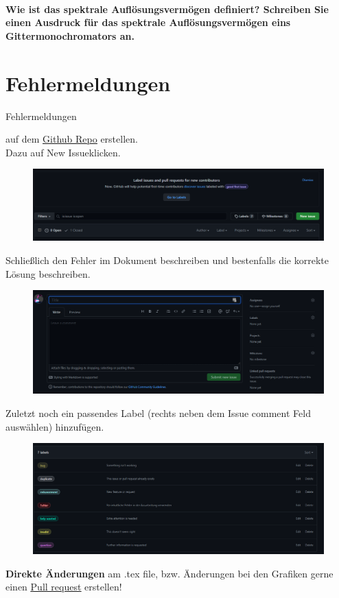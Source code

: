 \documentclass[a4paper, 11pt, parskip=half]{scrartcl}
\begin{document}
\paragraph{Wie ist das spektrale Auflösungsvermögen definiert? Schreiben Sie einen Ausdruck für das
spektrale Auflösungsvermögen eins Gittermonochromators an.}
\newpage
\section{Fehlermeldungen}
\label{sec:Fehler}
\hypertarget{Fehler}{Fehlermeldungen} auf dem \href{https://github.com/etschgi1/Ex2_Fragen/issues}{\underline{Github Repo}} erstellen.\\
Dazu auf \glqq New Issue\grqq klicken.
\begin{figure}[H]
    \centering
    \includegraphics[width=15cm]{image/Misc/Issues.png}
\end{figure}
Schließlich den Fehler im Dokument beschreiben und bestenfalls die korrekte Lösung beschreiben. 
\begin{figure}[H]
    \centering
    \includegraphics[width=15cm]{image/Misc/Issue_erstellen.png}
\end{figure}
Zuletzt noch ein passendes Label (rechts neben dem Issue comment Feld auswählen) hinzufügen.
\begin{figure}[H]
    \centering
    \includegraphics[width=15cm]{image/Misc/Labels.png}
\end{figure}
\vspace{5mm}
\textbf{Direkte Änderungen} am .tex file, bzw. Änderungen bei den Grafiken gerne einen \href{https://github.com/etschgi1/Ex2_Fragen/pulls}{\underline{Pull request}} erstellen!
\end{document}

